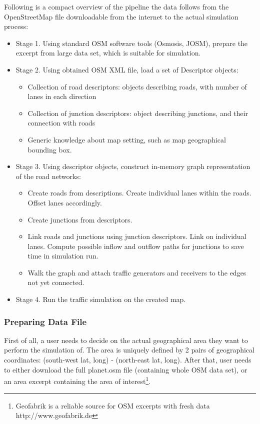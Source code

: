 Following is a compact overview of the pipeline the data follows from the OpenStreetMap file downloadable from the internet to the actual simulation process:
\begin{itemize}
    \item Stage 1. Using standard OSM software tools (Osmosis, JOSM), prepare the excerpt from large data set, which is suitable for simulation.
    \item Stage 2. Using obtained OSM XML file, load a set of Descriptor objects:
    \begin{itemize}
        \item Collection of road descriptors: objects describing roads, with number of lanes in each direction
        \item Collection of junction descriptors: object describing junctions, and their connection with roads
        \item Generic knowledge about map setting, such as map geographical bounding box.
    \end{itemize}

    \item Stage 3. Using descriptor objects, construct in-memory graph representation of the road networks:
    \begin{itemize}
        \item Create roads from descriptions. Create individual lanes within the roads. Offset lanes accordingly.
        \item Create junctions from descriptors.
        \item Link roads and junctions using junction descriptors. Link on individual lanes. Compute possible inflow and outflow paths for junctions to save time in simulation run.
        \item Walk the graph and attach traffic generators and receivers to the edges not yet connected.
    \end{itemize}

    \item Stage 4. Run the traffic simulation on the created map.
\end{itemize}

\subsubsection{Preparing Data File}
First of all, a user needs to decide on the actual geographical area they want to perform the simulation of. The area is uniquely defined by 2 pairs of geographical coordinates: (south-west lat, long) - (north-east lat, long). After that, user needs to either download the full planet.osm file (containing whole OSM data set), or an area excerpt containing the area of interest\footnote{Geofabrik is a reliable source for OSM excerpts with fresh data http://www.geofabrik.de}.

